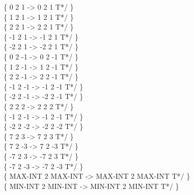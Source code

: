 \begin{tt}
\{       0 2       1 \word{*/} ->       0 2       1 T*/ \} \\
\{       1 2       1 \word{*/} ->       1 2       1 T*/ \} \\
\{       2 2       1 \word{*/} ->       2 2       1 T*/ \} \\
\{      -1 2       1 \word{*/} ->      -1 2       1 T*/ \} \\
\{      -2 2       1 \word{*/} ->      -2 2       1 T*/ \} \\
\{       0 2      -1 \word{*/} ->       0 2      -1 T*/ \} \\
\{       1 2      -1 \word{*/} ->       1 2      -1 T*/ \} \\
\{       2 2      -1 \word{*/} ->       2 2      -1 T*/ \} \\
\{      -1 2      -1 \word{*/} ->      -1 2      -1 T*/ \} \\
\{      -2 2      -1 \word{*/} ->      -2 2      -1 T*/ \} \\
\{       2 2       2 \word{*/} ->       2 2       2 T*/ \} \\
\{      -1 2      -1 \word{*/} ->      -1 2      -1 T*/ \} \\
\{      -2 2      -2 \word{*/} ->      -2 2      -2 T*/ \} \\
\{       7 2       3 \word{*/} ->       7 2       3 T*/ \} \\
\{       7 2      -3 \word{*/} ->       7 2      -3 T*/ \} \\
\{      -7 2       3 \word{*/} ->      -7 2       3 T*/ \} \\
\{      -7 2      -3 \word{*/} ->      -7 2      -3 T*/ \} \\
\{ MAX-INT 2 MAX-INT \word{*/} -> MAX-INT 2 MAX-INT T*/ \} \\
\{ MIN-INT 2 MIN-INT \word{*/} -> MIN-INT 2 MIN-INT T*/ \}


\end{tt}
